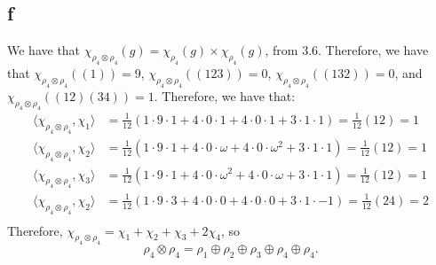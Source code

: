 \documentclass[]{article}
\begin{document}
\subsection*{f}
We have that $\chi_{\rho_4 \otimes \rho_4}(g) = \chi_{\rho_4}(g) \times \chi_{\rho_4}(g)$, from 3.6. Therefore, we have that $\chi_{\rho_4 \otimes \rho_4}((1)) = 9$, $\chi_{\rho_4 \otimes \rho_4}((123)) = 0$, $\chi_{\rho_4 \otimes \rho_4}((132)) = 0$, and $\chi_{\rho_4 \otimes \rho_4}((12)(34)) = 1$. Therefore, we have that:
\begin{align*}
	\langle \chi_{\rho_4 \otimes \rho_4}, \chi_1 \rangle &= \frac{1}{12} ( 1 \cdot 9 \cdot 1 + 4 \cdot 0 \cdot 1 + 4 \cdot 0 \cdot 1 + 3 \cdot 1 \cdot 1) = \frac{1}{12}(12) = 1\\
	\langle \chi_{\rho_4 \otimes \rho_4}, \chi_2 \rangle &= \frac{1}{12} ( 1 \cdot 9 \cdot 1 + 4 \cdot 0 \cdot \omega + 4 \cdot 0 \cdot \omega^2 + 3 \cdot 1 \cdot 1) = \frac{1}{12}(12) = 1\\
	\langle \chi_{\rho_4 \otimes \rho_4}, \chi_3 \rangle &= \frac{1}{12} ( 1 \cdot 9 \cdot 1 + 4 \cdot 0 \cdot \omega^2 + 4 \cdot 0 \cdot \omega + 3 \cdot 1 \cdot 1) = \frac{1}{12}(12) = 1\\
	\langle \chi_{\rho_4 \otimes \rho_4}, \chi_2 \rangle &= \frac{1}{12} ( 1 \cdot 9 \cdot 3 + 4 \cdot 0 \cdot 0 + 4 \cdot 0 \cdot 0 + 3 \cdot 1 \cdot -1) = \frac{1}{12}(24) = 2\\
\end{align*}
Therefore, $\chi_{\rho_4 \otimes \rho_4} = \chi_1 + \chi_2 + \chi_3 + 2 \chi_4$, so
\begin{equation}
	\rho_4 \otimes \rho_4 = \rho_1 \oplus \rho_2 \oplus \rho_3 \oplus \rho_4 \oplus \rho_4.
\end{equation}
\end{document}
